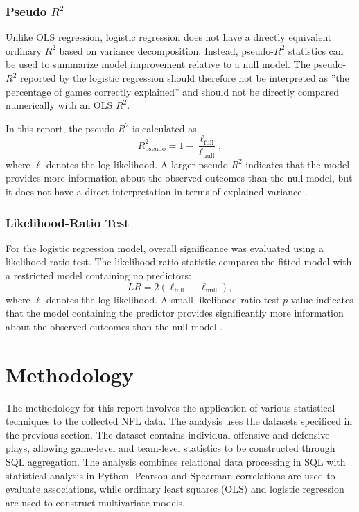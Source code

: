 \documentclass[11pt]{article}
\begin{document}
\subsubsection*{Pseudo $R^2$} 
Unlike OLS regression, logistic regression does not have a directly equivalent ordinary $R^2$ based on variance decomposition. Instead, pseudo-$R^2$ statistics can be used to summarize model improvement relative to a null model. The pseudo-$R^2$ reported by the logistic regression should therefore not be interpreted as ''the percentage of games correctly explained'' and should not be directly compared numerically with an OLS $R^2$.

In this report, the pseudo-$R^2$ is calculated as \[ R^2_{\mathrm{pseudo}} = 1 - \frac{\ell_{\mathrm{full}}}{\ell_{\mathrm{null}}}, \] where $\ell$ denotes the log-likelihood. A larger pseudo-$R^2$ indicates that the model provides more information about the observed outcomes than the null model, but it does not have a direct interpretation in terms of explained variance \cite{pseudo_r2}.

\subsubsection*{Likelihood-Ratio Test} 
For the logistic regression model, overall significance was evaluated using a likelihood-ratio test. The likelihood-ratio statistic compares the fitted model with a restricted model containing no predictors: \[ LR = 2 \left( \ell_{\mathrm{full}} - \ell_{\mathrm{null}} \right), \] where $\ell$ denotes the log-likelihood. A small likelihood-ratio test $p$-value indicates that the model containing the predictor provides significantly more information about the observed outcomes than the null model \cite{lrt}.



\section*{Methodology}
The methodology for this report involves the application of various statistical techniques to the collected NFL data. The analysis uses the datasets specificed in the previous section. The dataset contains individual offensive and defensive plays, allowing game-level and team-level statistics to be constructed through SQL aggregation. The analysis combines relational data processing in SQL with statistical analysis in Python. Pearson and Spearman correlations are used to evaluate associations, while ordinary least squares (OLS) and logistic regression are used to construct multivariate models.
\end{document}

